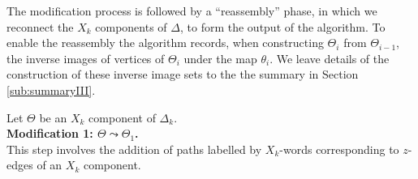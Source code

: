 \documentclass[a4paper,12pt]{article}
\newcommand{\D}{\Delta }
\newcommand{\T}{\Theta }
\numberwithin{equation}{section}
\numberwithin{figure}{section}
\begin{document}
The modification process is followed by a ``reassembly'' phase, in which
we reconnect the $X_k$ components of $\D$, 
to form the output of the algorithm. 
To enable the reassembly the algorithm records, when constructing 
$\Theta_{i}$ from $\Theta_{i-1}$, the inverse images of vertices of 
$\Theta_{i}$ under the map $\theta_i$. We leave details of the
construction of these inverse image sets to the the summary
in 
Section \ref{sub:summaryIII}. 
 
Let $\T$ be an $X_k$ component of $\D_k$.
\\[1em]

\noindent\textbf{Modification 1: $\T\leadsto \T_1$.}\\
This step involves the addition of paths labelled by $X_k$-words corresponding to
$z$-edges of an $X_k$ component.
\end{document}
